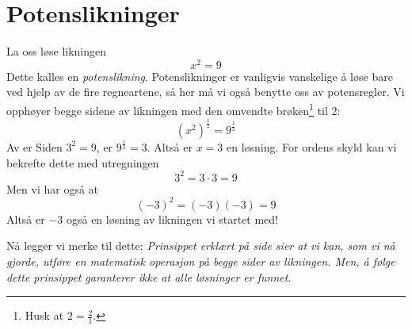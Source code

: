 \newpage
{} \vsk
{}
\newpage
{}
\section{Potenslikninger}
La oss løse likningen
\[ x^2=9 \]
Dette kalles en \textit{potenslikning}. Potenslikninger er vanligvis vanskelige å løse bare ved hjelp av de fire regneartene, så her må vi også benytte oss av potensregler. Vi opphøyer begge sidene av likningen med den omvendte brøken\footnote{Husk at $ 2=\frac{2}{1} $.} til 2:
\[ \left(x^2\right)^\frac{1}{2}=9^\frac{1}{2} \]
Av  er
Siden $ 3^2=9 $, er $ 9^\frac{1}{2}=3 $. Altså er $ {x=3} $ en løsning. For ordens skyld kan vi bekrefte dette med utregningen
\[ 3^2=3\cdot3=9 \]
Men vi har også at
\[ (-3)^2=(-3)(-3)=9 \]
Altså er $ -3 $ også en løsning av likningen vi startet med! \vsk

Nå legger vi merke til dette: \textsl{Prinsippet erklært på side \pageref{principle} sier at vi kan, som vi nå gjorde, utføre en matematisk operasjon på begge sider av likningen. Men, å følge dette prinsippet garanterer ikke at alle løsninger er funnet.}\regv

